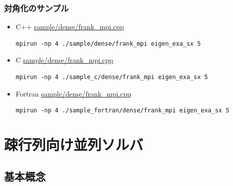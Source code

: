 \begin{frame}[c,fragile]
  \frametitle{対角化のサンプル}
  \begin{itemize}
  \item C++ \href{https://github.com/t-sakashita/rokko/blob/master/sample/dense/frank_dense_mpi.cpp}{sample/dense/frank\_mpi.cpp}
\begin{lstlisting}[style=shstyle]
mpirun -np 4 ./sample/dense/frank_mpi eigen_exa_sx 5
\end{lstlisting}
  \item C \href{https://github.com/t-sakashita/rokko/blob/master/sample/dense/frank_dense_mpi.cpp}{sample/dense/frank\_mpi.cpp}
\begin{lstlisting}[style=shstyle]
mpirun -np 4 ./sample_c/dense/frank_mpi eigen_exa_sx 5
\end{lstlisting}
  \item Fortran \href{https://github.com/t-sakashita/rokko/blob/master/sample/dense/frank_dense_mpi.cpp}{sample/dense/frank\_mpi.cpp}
\begin{lstlisting}[style=shstyle]
mpirun -np 4 ./sample_fortran/dense/frank_mpi eigen_exa_sx 5
\end{lstlisting}

  \end{itemize}
\end{frame}

\section{疎行列向け並列ソルバ}

\subsection{基本概念}

